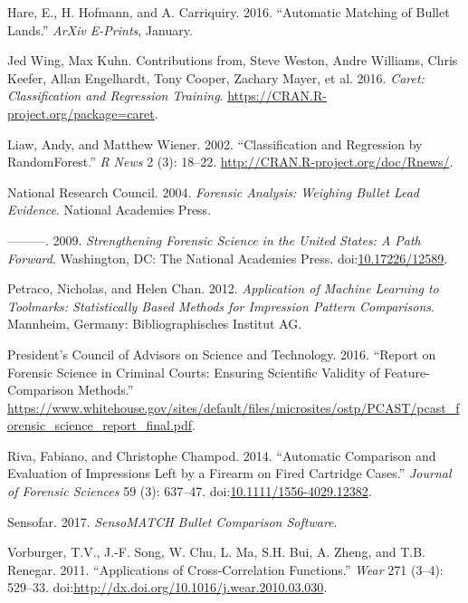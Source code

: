 \documentclass[12pt,]{article}
\theoremstyle{definition}
\theoremstyle{definition}
\theoremstyle{definition}
\theoremstyle{remark}
\begin{document}
\hypertarget{ref-2016arXiv160105788H}{}
Hare, E., H. Hofmann, and A. Carriquiry. 2016. ``Automatic Matching of
Bullet Lands.'' \emph{ArXiv E-Prints}, January.

\hypertarget{ref-caretpkg}{}
Jed Wing, Max Kuhn. Contributions from, Steve Weston, Andre Williams,
Chris Keefer, Allan Engelhardt, Tony Cooper, Zachary Mayer, et al. 2016.
\emph{Caret: Classification and Regression Training}.
\url{https://CRAN.R-project.org/package=caret}.

\hypertarget{ref-randomForest}{}
Liaw, Andy, and Matthew Wiener. 2002. ``Classification and Regression by
RandomForest.'' \emph{R News} 2 (3): 18--22.
\url{http://CRAN.R-project.org/doc/Rnews/}.

\hypertarget{ref-national2004forensic}{}
National Research Council. 2004. \emph{Forensic Analysis: Weighing
Bullet Lead Evidence}. National Academies Press.

\hypertarget{ref-NAS:2009}{}
---------. 2009. \emph{Strengthening Forensic Science in the United
States: A Path Forward}. Washington, DC: The National Academies Press.
doi:\href{https://doi.org/10.17226/12589}{10.17226/12589}.

\hypertarget{ref-petraco:2012}{}
Petraco, Nicholas, and Helen Chan. 2012. \emph{Application of Machine
Learning to Toolmarks: Statistically Based Methods for Impression
Pattern Comparisons}. Mannheim, Germany: Bibliographisches Institut AG.

\hypertarget{ref-pcast2016}{}
President's Council of Advisors on Science and Technology. 2016.
``Report on Forensic Science in Criminal Courts: Ensuring Scientific
Validity of Feature-Comparison Methods.''
\url{https://www.whitehouse.gov/sites/default/files/microsites/ostp/PCAST/pcast_forensic_science_report_final.pdf}.

\hypertarget{ref-riva:2014}{}
Riva, Fabiano, and Christophe Champod. 2014. ``Automatic Comparison and
Evaluation of Impressions Left by a Firearm on Fired Cartridge Cases.''
\emph{Journal of Forensic Sciences} 59 (3): 637--47.
doi:\href{https://doi.org/10.1111/1556-4029.12382}{10.1111/1556-4029.12382}.

\hypertarget{ref-sensofar}{}
Sensofar. 2017. \emph{SensoMATCH Bullet Comparison Software}.

\hypertarget{ref-vorburger:2011}{}
Vorburger, T.V., J.-F. Song, W. Chu, L. Ma, S.H. Bui, A. Zheng, and T.B.
Renegar. 2011. ``Applications of Cross-Correlation Functions.''
\emph{Wear} 271 (3--4): 529--33.
doi:\href{https://doi.org/http://dx.doi.org/10.1016/j.wear.2010.03.030}{http://dx.doi.org/10.1016/j.wear.2010.03.030}.
\end{document}
